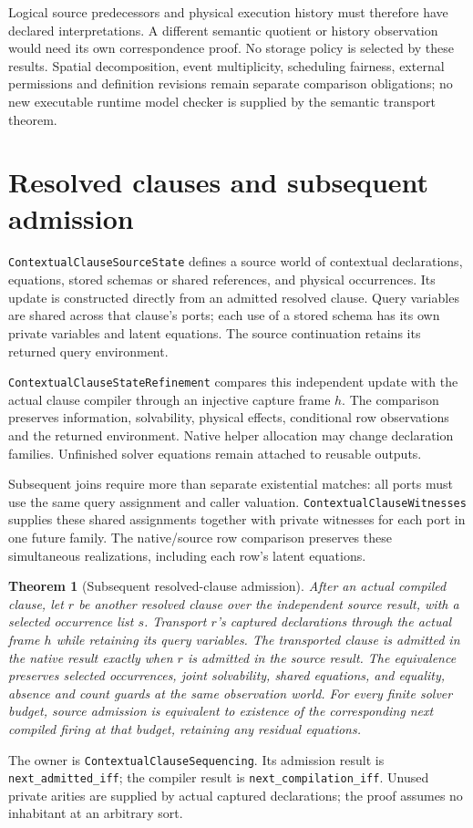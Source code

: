 \documentclass[11pt]{article}
\newtheorem{theorem}{Theorem}
\newcommand{\code}[1]{\texttt{\small #1}}
\begin{document}
Logical source predecessors and physical execution history must therefore
have declared interpretations. A different semantic quotient or history
observation would need its own correspondence proof. No storage policy is
selected by these results. Spatial decomposition, event multiplicity,
scheduling fairness, external permissions and definition revisions remain
separate comparison obligations; no new executable runtime model checker
is supplied by the semantic transport theorem.

\section{Resolved clauses and subsequent admission}

\code{ContextualClauseSourceState} defines a source world of contextual
declarations, equations, stored schemas or shared references, and physical
occurrences. Its update is constructed directly from an admitted resolved
clause. Query variables are shared across that clause's ports; each use of
a stored schema has its own private variables and latent equations.
The source continuation retains its returned query environment.

\code{ContextualClauseStateRefinement} compares this independent update
with the actual clause compiler through an injective capture frame $h$.
The comparison preserves information, solvability, physical effects,
conditional row observations and the returned environment. Native helper
allocation may change declaration families. Unfinished solver equations
remain attached to reusable outputs.

Subsequent joins require more than separate existential matches: all ports
must use the same query assignment and caller valuation.
\code{ContextualClauseWitnesses} supplies these shared assignments together
with private witnesses for each port in one future family. The native/source
row comparison preserves these simultaneous realizations, including each
row's latent equations.

\begin{theorem}[Subsequent resolved-clause admission]
After an actual compiled clause, let $r$ be another resolved clause over
the independent source result, with a selected occurrence list $s$.
Transport $r$'s captured declarations through the actual frame $h$ while
retaining its query variables. The transported clause is admitted in the
native result exactly when $r$ is admitted in the source result.
The equivalence preserves selected occurrences, joint solvability,
shared equations, and equality, absence and count guards at the same
observation world. For every finite solver budget, source admission is
equivalent to existence of the corresponding next compiled firing at
that budget, retaining any residual equations.
\end{theorem}
The owner is \code{ContextualClauseSequencing}.
Its admission result is \code{next\_admitted\_iff}; the compiler result is
\code{next\_compilation\_iff}.
Unused private arities are supplied by actual captured declarations;
the proof assumes no inhabitant at an arbitrary sort.
\end{document}
